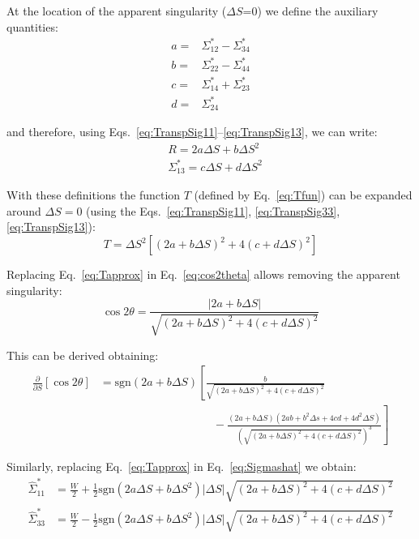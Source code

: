 At the location of the apparent singularity ($\Delta S$=0) we define the auxiliary quantities:
\begin{align}
a =& \Sigma^*_{12} - \Sigma^*_{34}\\
b =& \Sigma^*_{22} - \Sigma^*_{44}\\
c =& \Sigma^*_{14} + \Sigma^*_{23}\\
d =& \Sigma^*_{24} 
\end{align}

and therefore, using Eqs.~\ref{eq:TranspSig11}--\ref{eq:TranspSig13}, we can write:
\begin{align}
&R = 2a \Delta S + b \Delta S^2 \label{eq:specR}\\
&\Sigma^*_{13} =c \Delta S +d \Delta S^2\label{eq:specS13}
\end{align}

With these definitions the function $T$ (defined by Eq.~\ref{eq:Tfun}) can be expanded around $\Delta S =0$ (using the Eqs.~\ref{eq:TranspSig11}, \ref{eq:TranspSig33}, \ref{eq:TranspSig13}):
\begin{equation}
T = \Delta S^2\left[\left(2a +b \Delta S \right)^2 +4\left( c +d \Delta S\right)^2\right]
\label{eq:Tapprox}
\end{equation}

Replacing Eq.~\ref{eq:Tapprox} in Eq.~\ref{eq:cos2theta} allows  removing the apparent singularity:
\begin{equation}
\cos 2 \theta = \frac{\left| 2a+b \Delta S\right|}{\sqrt{\left(2a +b \Delta S \right)^2 +4\left( c +d \Delta S\right)^2}}
\label{eq:cost_spc}
\end{equation}

This can be derived obtaining:
\begin{align}
\frac{\partial }{\partial S} \left[ \cos 2\theta \right] &= \mathrm{sgn}(2a+b \Delta S)\left[
\frac{b}{\sqrt{\left(2a +b \Delta S \right)^2 +4\left( c +d \Delta S\right)^2}}
\right. \nonumber \\  &\left. \qquad \qquad \qquad \qquad \qquad
-\frac{(2a+b\Delta S)(2ab+b^2 \Delta s +4 c d+ 4 d^2 \Delta S)}{\left(\sqrt{\left(2a +b \Delta S \right)^2 +4\left( c +d \Delta S\right)^2}\right)^3}
\right]
\end{align}

Similarly, replacing Eq.~\ref{eq:Tapprox} in Eq.~\ref{eq:Sigmashat} we obtain:
\begin{align}
\hat{\Sigma}^*_{11} &= \frac{W}{2} + \frac{1}{2} \mathrm{sgn}\left(2a\Delta S + b \Delta S^2\right)\left| \Delta S\right| \sqrt{\left(2a +b \Delta S \right)^2 +4\left( c +d \Delta S\right)^2}\\
\hat{\Sigma}^*_{33} &= \frac{W}{2} - \frac{1}{2} \mathrm{sgn}\left(2a\Delta S + b \Delta S^2\right)\left| \Delta S\right| \sqrt{\left(2a +b \Delta S \right)^2 +4\left( c +d \Delta S\right)^2}\label{eq:SigmasSing}
\end{align}


